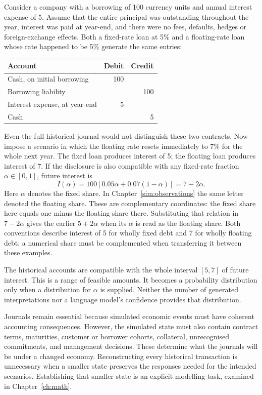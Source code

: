 Consider a company with a borrowing of 100 currency units and annual interest
expense of 5. Assume that the entire principal was outstanding throughout the
year, interest was paid at year-end, and there were no fees, defaults, hedges or
foreign-exchange effects. Both a fixed-rate loan at 5\% and a floating-rate loan
whose rate happened to be 5\% generate the same entries:
\begin{center}
\begin{tabular}{lrr}
\toprule Account & Debit & Credit\\\midrule
Cash, on initial borrowing &100&\\
Borrowing liability &&100\\\midrule
Interest expense, at year-end &5&\\
Cash &&5\\\bottomrule
\end{tabular}
\end{center}
Even the full historical journal would not distinguish these two contracts.
Now impose a scenario in which the floating rate resets immediately to 7\%
for the whole next year. The fixed loan produces interest of 5; the floating
loan produces interest of 7. If the disclosure is also compatible with any
fixed-rate fraction $\alpha\in[0,1]$, future interest is
\begin{equation}\label{eq:running}
 I(\alpha)=100[0.05\alpha+0.07(1-\alpha)]=7-2\alpha.
\end{equation}
Here $\alpha$ denotes the fixed share. In Chapter~\ref{sim:observations}
the same letter denoted the floating share. These are complementary
coordinates: the fixed share here equals one minus the floating share there.
Substituting that relation in $7-2\alpha$ gives the earlier $5+2\alpha$
when its $\alpha$ is read as the floating share. Both conventions describe
interest of 5 for wholly fixed debt and 7 for wholly floating debt; a numerical
share must be complemented when transferring it between these examples.

The historical accounts are compatible with the whole interval $[5,7]$ of
future interest. This is a range of feasible amounts. It becomes a probability
distribution only when a distribution for $\alpha$ is supplied. Neither the
number of generated interpretations nor a language model's confidence provides
that distribution.

Journals remain essential because simulated economic events must have coherent
accounting consequences. However, the simulated state must also contain
contract terms, maturities, customer or borrower cohorts, collateral,
unrecognised commitments, and management decisions. These determine what the
journals will be under a changed economy. Reconstructing every historical
transaction is unnecessary when a smaller state preserves the responses needed
for the intended scenarios. Establishing that smaller state is an explicit
modelling task, examined in Chapter~\ref{ch:math}.

